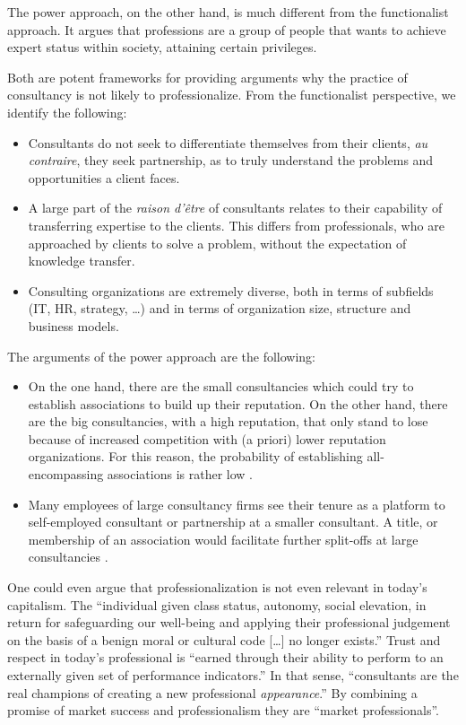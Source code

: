 \documentclass[12pt]{article}
\begin{document}
The power approach, on the other hand, is much different from the
functionalist approach. It argues that professions are a group of people
that wants to achieve expert status within society, attaining certain
privileges. \citep[ 75]{kieser2006}

Both are potent frameworks for providing arguments why the practice of
consultancy is not likely to professionalize. From the functionalist
perspective, we identify the following:

\begin{itemize}
\item
  Consultants do not seek to differentiate themselves from their
  clients, \emph{au contraire}, they seek partnership, as to truly
  understand the problems and opportunities a client faces.
  \citep{fincham2006}
\item
  A large part of the \emph{raison d'être} of consultants relates to
  their capability of transferring expertise to the clients. This
  differs from professionals, who are approached by clients to solve a
  problem, without the expectation of knowledge transfer.
  \citep{oakley1993}
\item
  Consulting organizations are extremely diverse, both in terms of
  subfields (IT, HR, strategy, \ldots) and in terms of organization
  size, structure and business models. \citep[ 79, 89]{kieser2006}
\end{itemize}

The arguments of the power approach are the following:

\begin{itemize}
\item
  On the one hand, there are the small consultancies which could try to
  establish associations to build up their reputation. On the other
  hand, there are the big consultancies, with a high reputation, that
  only stand to lose because of increased competition with (a priori)
  lower reputation organizations. For this reason, the probability of
  establishing all-encompassing associations is rather low \citep[
  77]{kieser2006}.
\item
  Many employees of large consultancy firms see their tenure as a
  platform to self-employed consultant or partnership at a smaller
  consultant. A title, or membership of an association would facilitate
  further split-offs at large consultancies \citep[ 80]{kieser2006}.
\end{itemize}

One could even argue that professionalization is not even relevant in
today's capitalism. The ``individual given class status, autonomy,
social elevation, in return for safeguarding our well-being and applying
their professional judgement on the basis of a benign moral or cultural
code {[}\ldots{]} no longer exists.'' \citep[1-2]{dent2013} Trust and
respect in today's professional is ``earned through their ability to
perform to an externally given set of performance indicators.'' In that
sense, ``consultants are the real champions of creating a new
professional \emph{appearance}.'' \citep[ 95]{kieser2006} By combining a
promise of market success and professionalism they are ``market
professionals''.
\end{document}
